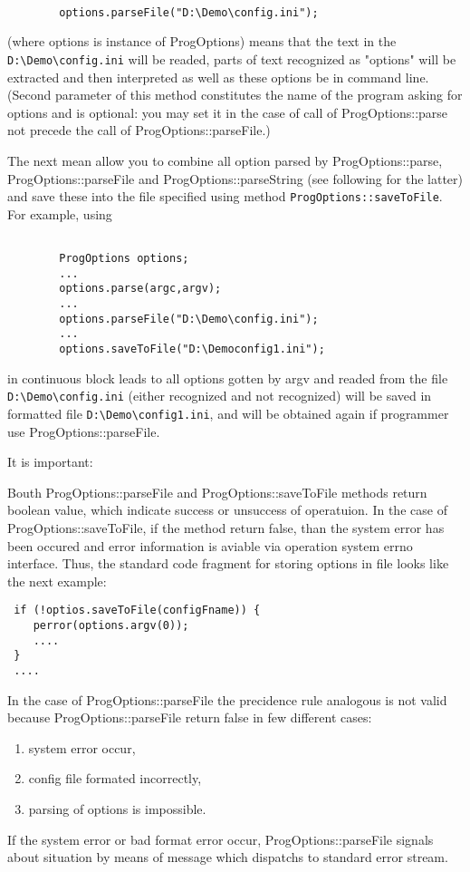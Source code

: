 \documentclass[10pt]{article}
\begin{document}
\begin{verbatim}

        options.parseFile("D:\Demo\config.ini");

\end{verbatim}
(where options is instance of ProgOptions)
means that the text in the \verb|D:\Demo\config.ini| will be readed, parts of text
recognized as "options" will be extracted and then interpreted as well as
these options be in command line. (Second parameter of this method constitutes the name
of the program asking for options and is optional: you may set it
in the case of call of ProgOptions::parse not precede the call of ProgOptions::parseFile.)

  The next mean allow you to combine all option parsed by ProgOptions::parse,
ProgOptions::parseFile and ProgOptions::parseString (see following for the latter)
and save these into the file specified using method
\verb|ProgOptions::saveToFile|.
For example, using 

\begin{verbatim}

        ProgOptions options;
        ...
        options.parse(argc,argv);
        ...
        options.parseFile("D:\Demo\config.ini");
        ...
        options.saveToFile("D:\Democonfig1.ini");

\end{verbatim}

in continuous block leads to all options gotten by argv and readed from the file
\verb|D:\Demo\config.ini| (either recognized and not recognized) will be saved in formatted
file \verb|D:\Demo\config1.ini|, and will be obtained again if programmer use ProgOptions::parseFile.

{\sf It is important:}

  Bouth ProgOptions::parseFile and ProgOptions::saveToFile methods return boolean value, which
indicate success or unsuccess of operatuion. In the case of ProgOptions::saveToFile, if
the method return false, than the system error has been occured and error information
is aviable via operation system errno interface.
Thus, the standard code fragment for storing options in file looks like the
next example:

\begin{verbatim}
 if (!optios.saveToFile(configFname)) {
    perror(options.argv(0));
    ....
 } 
 ....
\end{verbatim}

In the case of ProgOptions::parseFile the precidence rule analogous is not valid because
ProgOptions::parseFile return false in few different cases:
\begin{enumerate}
 \item system error occur,
 \item config file formated incorrectly,
 \item parsing of options is impossible.
\end{enumerate}
If the system error or bad format error occur, ProgOptions::parseFile
signals about situation by means of message which dispatchs to standard error stream.
\end{document}
